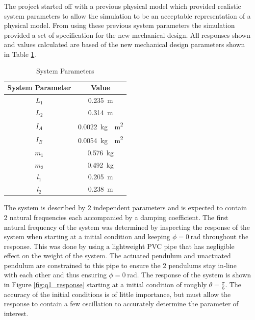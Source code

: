 The project started off with a previous physical model which provided realistic system parameters to allow the simulation to be an acceptable representation of a physical model. From using these previous system parameters the simulation provided a set of specification for the new mechanical design. All responses shown and values calculated are based of the new mechanical design parameters shown in Table \ref{table:system_param}.\\


		\begin{table}[]
	\centering
	\begin{tabular}{|c|c|}
		\hline
		System Parameter & Value \\
		\hline
		\hline
		$L_{1}$ & \SI{0.235}{m} \\
		\hline
		$L_{2}$ & \SI{0.314}{m} \\ 
		\hline
		$I_{A}$ & \SI{ 0.0022}{kg\cdot m^2}\\
		\hline
		$I_{B}$ & \SI{0.0054}{kg\cdot m^2}\\
		\hline
		$m_{1}$ & \SI{0.576}{kg}\\
		\hline
		$m_{2}$ & \SI{0.492}{kg} \\
		\hline
		$l_{1}$ & \SI{0.205}{m}\\
		\hline
		$l_{2}$ & \SI{0.238}{m}\\
		\hline
	\end{tabular}
	\caption{System Parameters}
	\label{table:system_param}
\end{table}


The system is described by 2 independent parameters and is expected to contain 2 natural frequencies each accompanied by a damping coefficient. The first natural frequency of the system was determined by inspecting the response of the system when starting at a initial condition and keeping $\phi = \SI{0}{\radian}$ throughout the response. This was done by using a lightweight PVC pipe that has negligible effect on the weight of the system. The actuated pendulum and unactuated pendulum are constrained to this pipe to ensure the 2 pendulums stay in-line with each other and thus ensuring $\phi = \SI{0}{\radian}$. The response of the system is shown in Figure \ref{fig:q1_response} starting at a initial condition of roughly $\theta = \frac{\pi}{6}$. The accuracy of the initial conditions is of little importance, but must allow the response to contain a few oscillation to accurately determine the parameter of interest.\\

